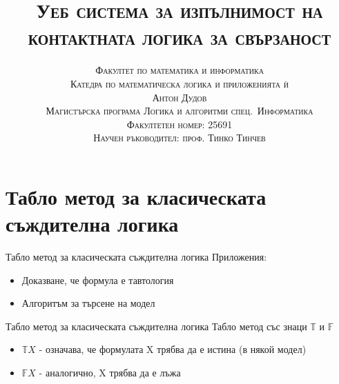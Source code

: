 \documentclass[14pt, aspectratio=169]{beamer}
\date[\today]{}
\title{\textsc{Уеб система за изпълнимост на контактната логика за свързаност}}
\author[Антон Дудов]{
	\textsc{Факултет по математика и информатика} \\
	\textsc{Катедра по математическа логика и приложенията ѝ} \\ [4mm]
	\textsc{Антон Дудов} \\ [4mm]
	\small
	\textsc{Магистърска програма Логика и алгоритми спец.~Информатика} \\ 
	\textsc{Факултетен номер: 25691} \\ [3mm]
	\small\textsc{Научен ръководител: проф. Тинко Тинчев}
}
\newcommand\ST{\mathbb{T}}
\newcommand\SF{\mathbb{F}}
\begin{document}
\begin{frame}
\titlepage
\end{frame}

\begin{frame}
\tableofcontents
\end{frame}

\section{Табло метод за класическата съждителна логика}


\begin{frame}{Табло метод за класическата съждителна логика}
Приложения:
\begin{itemize}
	\item<1-> Доказване, че формула е тавтология

	\item<3-> Алгоритъм за търсене на модел %
\end{itemize}
\end{frame}



\begin{frame}{Табло метод за класическата съждителна логика}
	Табло метод със знаци $\ST$ и $\SF$
	\begin{itemize}
		\item $\ST X$ - означава, че формулата X трябва да е истина (в някой модел)
		\item $\SF X$ - аналогично, X трябва да е лъжа
	\end{itemize}
\end{frame}
\end{document}

